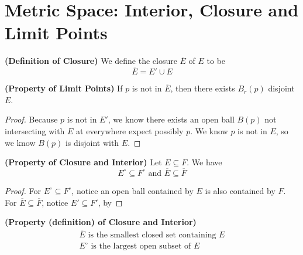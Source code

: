 \documentclass{report}
\begin{document}
\section{Metric Space: Interior, Closure and Limit Points}
\begin{definition}
\label{2.5.1}
\textbf{(Definition of Closure)} We define the closure $\overline{E}$ of $E$ to be
\begin{equation}
\overline{E}=E'\cup E
\end{equation}
\end{definition}
\begin{theorem}
\label{2.5.2}
\textbf{(Property of Limit Points)} If $p$ is not in $\overline{E}$, then there exists $B_r(p)$ disjoint $E$.
\end{theorem} 
\begin{proof}
  Because $p$ is not in $E'$, we know  there exists an open ball $B(p)$ not intersecting with  $E$ at everywhere expect possibly  $p$. We know  $p$ is not in $E$, so we know  $B(p)$ is disjoint with $E$.
\end{proof}
\begin{theorem}
\label{2.5.3}
\textbf{(Property of Closure and Interior)} Let $E\subseteq F$. We have
\begin{equation}
E^\circ \subseteq F^\circ\text{ and }\overline{E}\subseteq \overline{F}
\end{equation}
\end{theorem}
\begin{proof}
For $E^\circ \subseteq F^\circ $, notice an open ball contained by $E$ is also contained by $F$. For  $\overline{E}\subseteq \overline{F}$, notice $E'\subseteq F'$, by 
\end{proof}
\begin{theorem}
\label{2.5.4}
\textbf{(Property (definition) of Closure and Interior)} 
\begin{gather}
\text{ $\overline{E}$ is the smallest closed set containing $E$ }\\
\text{ $E^\circ $ is the largest open subset of $E$ }
\end{gather}
\end{theorem}
\end{document}
